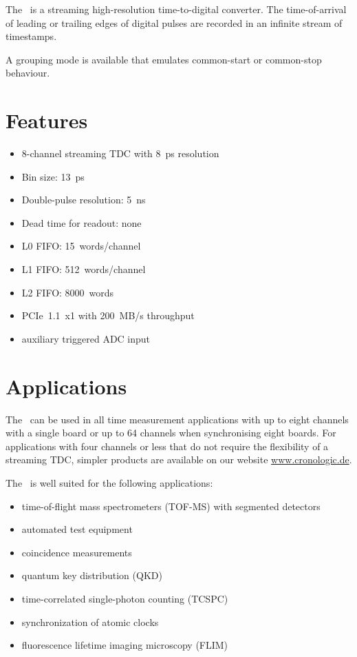The \deviceName\ is a streaming high-resolution time-to-digital converter. 
The time-of-arrival of leading or trailing edges of digital pulses are
recorded in an infinite stream of timestamps.

A grouping mode is available that emulates common-start or common-stop
behaviour. 

\section{Features}
	\begin{itemize}
		\item 8-channel streaming TDC with 8~ps resolution
		\item Bin size: 13~ps
		\item Double-pulse resolution: 5~ns
		\item Dead time for readout: none
		\item L0 FIFO: 15~words/channel
		\item L1 FIFO: 512~words/channel
		\item L2 FIFO: 8000~words
		\item PCIe~1.1~x1 with 200~MB/s throughput
		\item auxiliary triggered ADC input
	\end{itemize} 
\section{Applications}
The \deviceName\ can be used in all time measurement applications with up to
eight channels with a single board or up to 64 channels when synchronising
eight boards. For applications with four channels or less that do not require
the flexibility of a streaming TDC, simpler products are available on our
website \href{https://www.cronologic.de/products/products-overview#tdcdata}{%
www.cronologic.de}.

The \deviceName\ is well suited for the following applications:
\begin{itemize}
	\item time-of-flight mass spectrometers (TOF-MS) with segmented detectors
	\item automated test equipment
	\item coincidence measurements
	\item quantum key distribution (QKD)
	\item time-correlated single-photon counting (TCSPC)
	\item synchronization of atomic clocks
	\item fluorescence lifetime imaging microscopy (FLIM)
\end{itemize} 